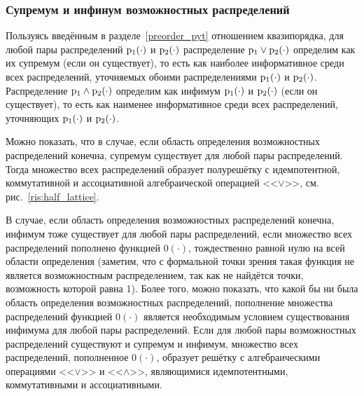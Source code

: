 
	
\subsubsection{Супремум и инфинум возможностных распределений}
\label{inf_sup_poss}

Пользуясь введённым в разделе~\ref{preorder_pyt} отношением квазипорядка, для любой пары распределений ${\mathrm{p}}_1(\cdot)$ и ${\mathrm{p}}_2(\cdot)$ распределение ${\mathrm{p}}_1\vee{\mathrm{p}}_2(\cdot)$ определим как их супремум (если он существует), то есть как наиболее информативное среди всех распределений, уточняемых обоими распределениями ${\mathrm{p}}_1(\cdot)$ и ${\mathrm{p}}_2(\cdot)$. Распределение ${\mathrm{p}}_1\wedge{\mathrm{p}}_2(\cdot)$ определим как инфимум ${\mathrm{p}}_1(\cdot)$ и ${\mathrm{p}}_2(\cdot)$ (если он существует), то есть как наименее информативное среди всех распределений, уточняющих ${\mathrm{p}}_1(\cdot)$ и ${\mathrm{p}}_2(\cdot)$.

Можно показать, что в случае, если область определения возможностных распределений конечна, супремум существует для любой пары распределений.  Тогда множество всех распределений образует полурешётку с идемпотентной, коммутативной и ассоциативной алгебраической операцией <<$\vee$>>, см. рис.~\ref{ris:half_lattice}. 
\begin{notice}
В случае, если область определения возможностных распределений конечна, инфимум тоже существует для любой пары распределений, если множество всех распределений пополнено функцией $0(\cdot)$, тождественно равной нулю на всей области определения (заметим, что с формальной точки зрения такая функция не является возможностным распределением, так как не найдётся точки, возможность которой равна 1). Более того, можно показать, что какой бы ни была область определения возможностных распределений, пополнение множества распределений функцией $0(\cdot)$ является необходимым условием существования инфимума для любой пары распределений. Если для любой пары возможностных распределений существуют и супремум и инфимум, множество всех распределений, пополненное $0(\cdot)$, образует решётку с алгебраическими операциями <<$\vee$>> и <<$\wedge$>>, являющимися идемпотентными, коммутативными и ассоциативными.
\end{notice}

